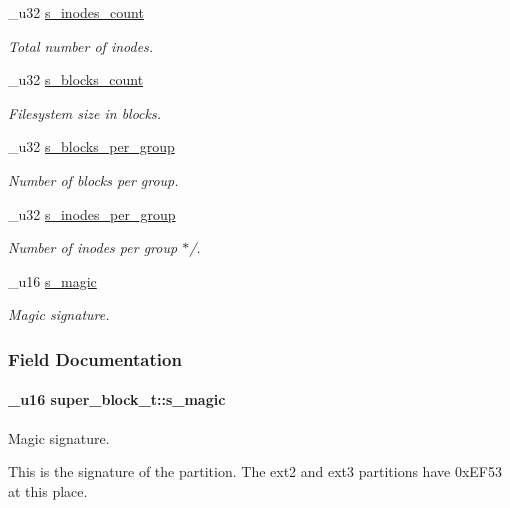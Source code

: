 \begin{CompactItemize}
\item 
\hypertarget{structsuper__block__t_m0}{
\_\-u32 \hyperlink{structsuper__block__t_m0}{s\_\-inodes\_\-count}}
\label{structsuper__block__t_m0}

\begin{CompactList}\small\item\em Total number of inodes.\item\end{CompactList}\item 
\hypertarget{structsuper__block__t_m1}{
\_\-u32 \hyperlink{structsuper__block__t_m1}{s\_\-blocks\_\-count}}
\label{structsuper__block__t_m1}

\begin{CompactList}\small\item\em Filesystem size in blocks.\item\end{CompactList}\item 
\hypertarget{structsuper__block__t_m8}{
\_\-u32 \hyperlink{structsuper__block__t_m8}{s\_\-blocks\_\-per\_\-group}}
\label{structsuper__block__t_m8}

\begin{CompactList}\small\item\em Number of blocks per group.\item\end{CompactList}\item 
\hypertarget{structsuper__block__t_m10}{
\_\-u32 \hyperlink{structsuper__block__t_m10}{s\_\-inodes\_\-per\_\-group}}
\label{structsuper__block__t_m10}

\begin{CompactList}\small\item\em Number of inodes per group $\ast$/.\item\end{CompactList}\item 
\_\-u16 \hyperlink{structsuper__block__t_m15}{s\_\-magic}
\begin{CompactList}\small\item\em Magic signature.\item\end{CompactList}\end{CompactItemize}


\subsubsection{Field Documentation}
\hypertarget{structsuper__block__t_m15}{
\paragraph[s\_\-magic]{\setlength{\rightskip}{0pt plus 5cm}\_\-u16 super\_\-block\_\-t::s\_\-magic}\hfill}
\label{structsuper__block__t_m15}


Magic signature.

This is the signature of the partition. The ext2 and ext3 partitions have 0x\-EF53 at this place.